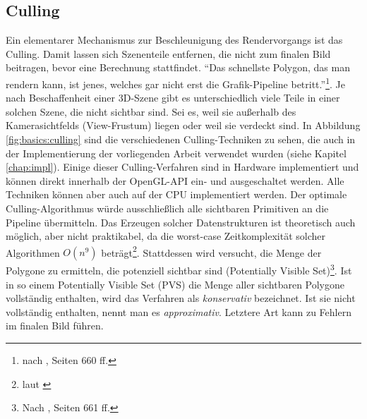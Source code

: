 \subsection{Culling}
\label{sec:basics:algos:culling}
Ein elementarer Mechanismus zur Beschleunigung des Rendervorgangs ist das Culling. Damit lassen sich Szenenteile entfernen, die nicht zum finalen Bild beitragen, bevor eine Berechnung stattfindet. "`Das schnellste Polygon, das man rendern kann, ist jenes, welches gar nicht erst die Grafik-Pipeline betritt."'\footnote{nach \cite{RTR3}, Seiten 660 ff.}. Je nach Beschaffenheit einer 3D-Szene gibt es unterschiedlich viele Teile in einer solchen Szene, die nicht sichtbar sind. Sei es, weil sie außerhalb des Kamerasichtfelds (View-Frustum) liegen oder weil sie verdeckt sind. In Abbildung \ref{fig:basics:culling} sind die verschiedenen Culling-Techniken zu sehen, die auch in der Implementierung der vorliegenden Arbeit verwendet wurden (siehe Kapitel \ref{chap:impl}).
Einige dieser Culling-Verfahren sind in Hardware implementiert und können direkt innerhalb der OpenGL-API ein- und ausgeschaltet werden. Alle Techniken können aber auch auf der CPU implementiert werden. Der optimale Culling-Algorithmus würde ausschließlich alle sichtbaren Primitiven an die Pipeline übermitteln. Das Erzeugen solcher Datenstrukturen ist theoretisch auch möglich, aber nicht praktikabel, da die worst-case Zeitkomplexität solcher Algorithmen $O(n^{9})$ beträgt\footnote{laut \cite{culling}}. Stattdessen wird versucht, die Menge der Polygone zu ermitteln, die potenziell sichtbar sind (Potentially Visible Set)\footnote{Nach \cite{RTR3}, Seiten 661 ff.}. Ist in so einem Potentially Visible Set (PVS) die Menge aller sichtbaren Polygone vollständig enthalten, wird das Verfahren als \textit{konservativ} bezeichnet. Ist sie nicht vollständig enthalten, nennt man es \textit{approximativ}. Letztere Art kann zu Fehlern im finalen Bild führen.

